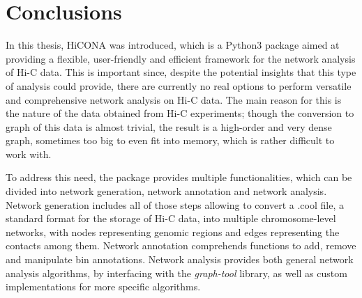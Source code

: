 \graphicspath{{chapters/07_conclusions/}}
\chapter{Conclusions}


In this thesis, HiCONA was introduced, which is a Python3 package aimed at providing a flexible, user-friendly and efficient framework for the network analysis of Hi-C data. This is important since, despite the potential insights that this type of analysis could provide, there are currently no real options to perform versatile and comprehensive network analysis on Hi-C data. The main reason for this is the nature of the data obtained from Hi-C experiments; though the conversion to graph of this data is almost trivial, the result is a high-order and very dense graph, sometimes too big to even fit into memory, which is rather difficult to work with.

To address this need, the package provides multiple functionalities, which can be divided into network generation, network annotation and network analysis. Network generation includes all of those steps allowing to convert a .cool file, a standard format for the storage of Hi-C data, into multiple chromosome-level networks, with nodes representing genomic regions and edges representing the contacts among them. Network annotation comprehends functions to add, remove and manipulate bin annotations. Network analysis provides both general network analysis algorithms, by interfacing with the \textit{graph-tool} library, as well as custom implementations for more specific algorithms. 

